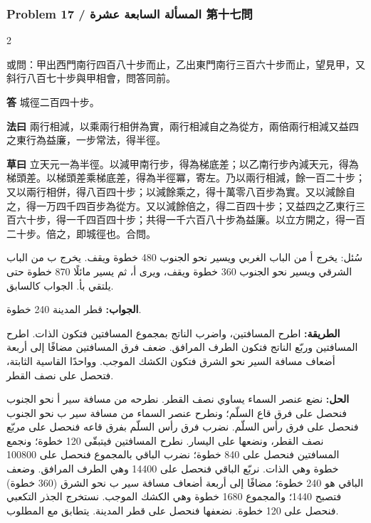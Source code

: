 \documentclass[11pt,a4paper]{article}
\newcommand{\ar}[1]{\arabicfont\beginR #1\endR}
\newcommand{\Answer}[1]{\par\noindent\textbf{\color{problemcolor}答} #1\par}
\newcommand{\Method}[1]{\par\noindent\textbf{\color{problemcolor}法曰} #1\par}
\newcommand{\Workings}[1]{\par\noindent\textbf{\color{problemcolor}草曰} #1\par}
\newcommand{\AnswerAr}{\par\noindent\textbf{\color{problemcolor}\ar{الجواب:}} }
\newcommand{\MethodAr}{\par\noindent\textbf{\color{problemcolor}\ar{الطريقة:}} }
\newcommand{\WorkingsAr}{\par\noindent\textbf{\color{problemcolor}\ar{الحل:}} }
\begin{document}
\vspace{0.5cm}

\subsubsection*{Problem 17 / \ar{المسألة السابعة عشرة} \quad 第十七問}

\begin{paracol}{2}

\noindent 或問：甲出西門南行四百八十步而止，乙出東門南行三百六十步而止，望見甲，又斜行八百七十步與甲相會，問答同前。

\vspace{0.2cm}

\Answer{城徑二百四十步。}

\vspace{0.2cm}

\Method{兩行相減，以乘兩行相併為實，兩行相減自之為從方，兩倍兩行相減又益四之東行為益廉，一步常法，得半徑。}

\vspace{0.2cm}

\Workings{立天元一為半徑。以減甲南行步，得為梯底差；以乙南行步內減天元，得為梯頭差。以梯頭差乘梯底差，得為半徑冪，寄左。乃以兩行相減，餘一百二十步；又以兩行相併，得八百四十步；以減餘乘之，得十萬零八百步為實。又以減餘自之，得一万四千四百步為從方。又以減餘倍之，得二百四十步；又益四之乙東行三百六十步，得一千四百四十步；共得一千六百八十步為益廉。以立方開之，得一百二十步。倍之，即城徑也。合問。}

\switchcolumn

\ar{سُئل: يخرج أ من الباب الغربي ويسير نحو الجنوب 480 خطوة ويقف. يخرج ب من الباب الشرقي ويسير نحو الجنوب 360 خطوة ويقف، ويرى أ، ثم يسير مائلًا 870 خطوة حتى يلتقي بأ. الجواب كالسابق.}

\vspace{0.2cm}

\AnswerAr{قطر المدينة 240 خطوة.}

\vspace{0.2cm}

\MethodAr{اطرح المسافتين، واضرب الناتج بمجموع المسافتين فتكون الذات. اطرح المسافتين وربّع الناتج فتكون الطرف المرافق. ضعف فرق المسافتين مضافًا إلى أربعة أضعاف مسافة السير نحو الشرق فتكون الكشك الموجب. وواحدًا القاسية الثابتة، فتحصل على نصف القطر.}

\vspace{0.2cm}

\WorkingsAr{نضع عنصر السماء يساوي نصف القطر. نطرحه من مسافة سير أ نحو الجنوب فنحصل على فرق قاع السلّم؛ ونطرح عنصر السماء من مسافة سير ب نحو الجنوب فنحصل على فرق رأس السلّم. نضرب فرق رأس السلّم بفرق قاعه فنحصل على مربّع نصف القطر، ونضعها على اليسار. نطرح المسافتين فيتبقّى 120 خطوة؛ ونجمع المسافتين فنحصل على 840 خطوة؛ نضرب الباقي بالمجموع فنحصل على 100800 خطوة وهي الذات. نربّع الباقي فنحصل على 14400 وهي الطرف المرافق. وضعف الباقي هو 240 خطوة؛ مضافًا إلى أربعة أضعاف مسافة سير ب نحو الشرق (360 خطوة) فتصبح 1440؛ والمجموع 1680 خطوة وهي الكشك الموجب. نستخرج الجذر التكعبي فنحصل على 120 خطوة. نضعفها فنحصل على قطر المدينة. يتطابق مع المطلوب.}

\end{paracol}
\end{document}
